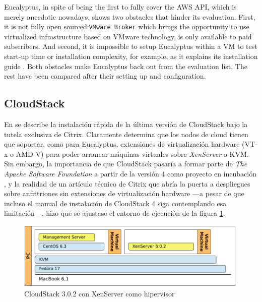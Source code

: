 
Eucalyptus, in spite of being the first to fully cover the AWS API, which is merely anecdotic nowadays, shows two obstacles that hinder its evaluation. First, it is not fully open sourced:\texttt{VMware Broker} which brings the opportunity to use virtualized infrastructure based on  VMware technology, is only available to paid subscribers. And second, it is impossible to setup Eucalyptus within a VM to test start-up time or installation complexity, for example, as it explains its installation guide \cite{eucainstall}. Both obstacles make Eucalyptus back out from the evaluation list. The rest have been compared after their setting up and configuration.

\subsection{CloudStack}\label{subsec:cloudstack}

\noindent En \cite{cloudstackquickinstall} se describe la instalaci\'on r\'apida de la \'ultima versi\'on de CloudStack bajo la tutela exclusiva de Citrix. Claramente determina que los nodos de cloud tienen que soportar, como para Eucalyptus, extensiones de vir\-tua\-li\-za\-ci\'on hardware (VT-x o AMD-V) para poder arrancar m\'aquinas virtuales sobre \emph{XenServer} o KVM. Sin embargo, la importancia de que CloudStack pasar\'ia a formar parte de \emph{The Apache Software Foundation} a partir de la versi\'on 4 como proyecto en incubaci\'on \cite{cloudstackstrategy}, y la realidad de un art\'iculo t\'ecnico de Citrix que abr\'ia la puerta a despliegues sobre anfritriones sin extensiones de virtualizaci\'on hardware \cite{cloudstacknohvm} ---a pesar de que incluso el manual de instalaci\'on de CloudStack 4 \cite{apachecloudstack4} siga contemplando esa limitaci\'on---, hizo que se ajustase el entorno de ejecuci\'on de la figura \ref{fig:cloudstack}.\newline

\begin{figure}[tbp]
\begin{center}
\includegraphics[width=0.99\textwidth]{imagenes/008.pdf}
 \caption{CloudStack 3.0.2 con XenServer como hipervisor}
\label{fig:cloudstack}
\end{center}
\end{figure}

